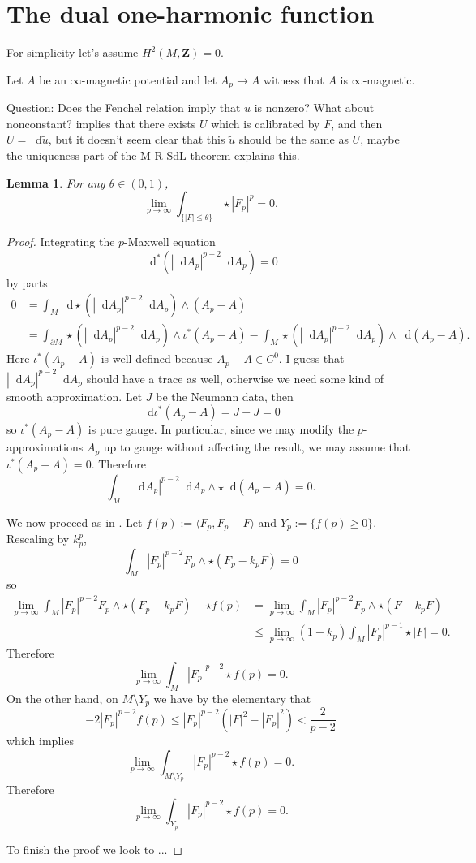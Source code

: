 \documentclass[reqno,11pt]{amsart}
\newcommand{\ZZ}{\mathbf{Z}}
\newcommand*\dif{\mathop{}\!\mathrm{d}}
\newtheorem{lemma}[theorem]{Lemma}
\theoremstyle{definition}
\numberwithin{equation}{section}
\begin{document}
\section{The dual one-harmonic function}
For simplicity let's assume $H^2(M, \ZZ) = 0$.

Let $A$ be an $\infty$-magnetic potential and let $A_p \to A$ witness that $A$ is $\infty$-magnetic.


Question: Does the Fenchel relation imply that $u$ is nonzero?
What about nonconstant?
\cite{bangert_cui_2017} implies that there exists $U$ which is calibrated by $F$, and then $U = \dif \tilde u$, but it doesn't seem clear that this $\tilde u$ should be the same as $U$, maybe the uniqueness part of the M-R-SdL theorem explains this.

\begin{lemma}
For any $\theta \in (0, 1)$,
	$$\lim_{p \to \infty} \int_{\{|F| \leq \theta\}} \star |F_p|^p = 0.$$
\end{lemma}
\begin{proof}
Integrating the $p$-Maxwell equation 
$$\dif^*(|\dif A_p|^{p - 2} \dif A_p) = 0$$
by parts 
\begin{align*}
	0 &= \int_M \dif \star (|\dif A_p|^{p - 2} \dif A_p) \wedge (A_p - A) \\
	&= \int_{\partial M} \star(|\dif A_p|^{p - 2} \dif A_p) \wedge \iota^* (A_p - A) - \int_M \star (|\dif A_p|^{p - 2} \dif A_p) \wedge \dif (A_p - A).
\end{align*}
Here $\iota^* (A_p - A)$ is well-defined because $A_p - A \in C^0$.
I guess that $|\dif A_p|^{p - 2} \dif A_p$ should have a trace as well, otherwise we need some kind of smooth approximation.
Let $J$ be the Neumann data, then 
$$\dif \iota^*(A_p - A) = J - J = 0$$
so $\iota^*(A_p - A)$ is pure gauge. In particular, since we may modify the $p$-approximations $A_p$ up to gauge without affecting the result, we may assume that $\iota^*(A_p - A) = 0$.
Therefore 
$$\int_M |\dif A_p|^{p - 2} \dif A_p \wedge \star \dif (A_p - A) = 0.$$

We now proceed as in \cite[Lemma 6.3]{daskalopoulos2020transverse}.
Let $f(p) := \langle F_p, F_p - F\rangle$ and $Y_p := \{f(p) \geq 0\}$.
Rescaling by $k_p^p$, 
$$\int_M |F_p|^{p - 2} F_p \wedge \star (F_p - k_p F) = 0$$
so 
\begin{align*}
	\lim_{p \to \infty} \int_M |F_p|^{p - 2} F_p \wedge \star (F_p - k_p F) - \star f(p) 
	&= \lim_{p \to \infty} \int_M |F_p|^{p - 2} F_p \wedge \star (F - k_p F) \\
	&\leq \lim_{p \to \infty} (1 - k_p) \int_M |F_p|^{p - 1} \star |F| = 0.
\end{align*}
Therefore 
$$\lim_{p \to \infty} \int_M |F_p|^{p - 2} \star f(p) = 0.$$
On the other hand, on $M \setminus Y_p$ we have by the elementary \cite[Lemma 6.2]{daskalopoulos2020transverse} that 
$$
	-2|F_p|^{p - 2} f(p) \leq |F_p|^{p - 2} (|F|^2 - |F_p|^2) < \frac{2}{p - 2}
$$
which implies 
$$\lim_{p \to \infty} \int_{M \setminus Y_p} |F_p|^{p - 2} \star f(p) = 0.$$
Therefore 
$$\lim_{p \to \infty} \int_{Y_p} |F_p|^{p - 2} \star f(p) = 0.$$

To finish the proof we look to \cite[Proposition 6.5]{daskalopoulos2020transverse}...
\end{proof}
\end{document}
